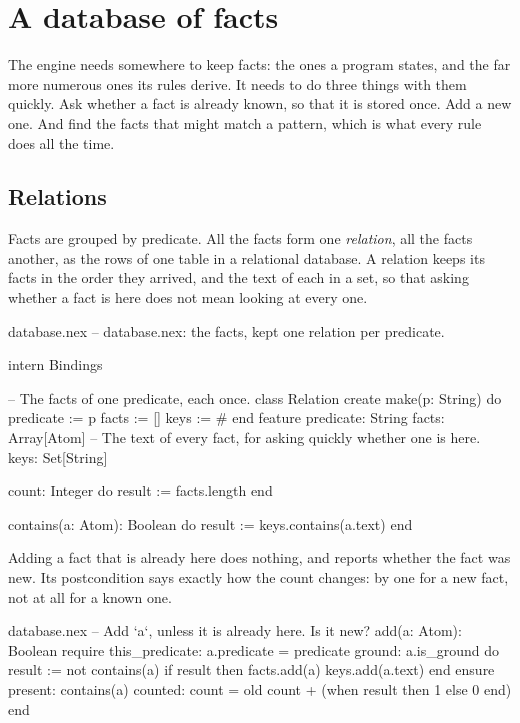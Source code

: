 \chapter{A database of facts}\label{ch:database}

The engine needs somewhere to keep facts: the ones a program states, and
the far more numerous ones its rules derive. It needs to do three things
with them quickly. Ask whether a fact is already known, so that it is
stored once. Add a new one. And find the facts that might match a pattern,
which is what every rule does all the time.

\section{Relations}

Facts are grouped by predicate. All the  facts form one
\emph{relation}, all the  facts another, as the rows of one
table in a relational database. A relation keeps its facts in the order
they arrived, and the text of each in a set, so that asking whether a fact
is here does not mean looking at every one.

\begin{newfile}{database.nex}
-- database.nex: the facts, kept one relation per predicate.

intern Bindings

-- The facts of one predicate, each once.
class Relation
create
  make(p: String)
  do
    predicate := p
    facts := []
    keys := #{}
  end
feature
  predicate: String
  facts: Array[Atom]
  -- The text of every fact, for asking quickly whether one is here.
  keys: Set[String]

  count: Integer
  do
    result := facts.length
  end

  contains(a: Atom): Boolean
  do
    result := keys.contains(a.text)
  end
\end{newfile}

Adding a fact that is already here does nothing, and  reports
whether the fact was new. Its postcondition  says exactly how
the count changes: by one for a new fact, not at all for a known one.

\begin{continued}{database.nex}
  -- Add `a`, unless it is already here. Is it new?
  add(a: Atom): Boolean
  require
    this_predicate: a.predicate = predicate
    ground: a.is_ground
  do
    result := not contains(a)
    if result then
      facts.add(a)
      keys.add(a.text)
    end
  ensure
    present: contains(a)
    counted: count = old count + (when result then 1 else 0 end)
  end
\end{continued}

